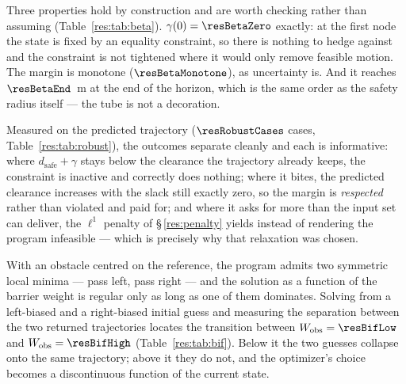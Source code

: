 Three properties hold by construction and are worth checking rather than assuming (Table~\ref{res:tab:beta}). $\gamma(0)=\resBetaZero$ exactly: at the first node the state is fixed by an equality constraint, so there is nothing to hedge against and the constraint is not tightened where it would only remove feasible motion. The margin is monotone ($\resBetaMonotone$), as uncertainty is. And it reaches $\resBetaEnd$~m at the end of the horizon, which is the same order as the safety radius itself --- the tube is not a decoration.

Measured on the predicted trajectory ($\resRobustCases$ cases, Table~\ref{res:tab:robust}), the outcomes separate cleanly and each is informative: where $d_{\mathrm{safe}}+\gamma$ stays below the clearance the trajectory already keeps, the constraint is inactive and correctly does nothing; where it bites, the predicted clearance increases with the slack still exactly zero, so the margin is \emph{respected} rather than violated and paid for; and where it asks for more than the input set can deliver, the $\ell^1$ penalty of \S\,\ref{res:penalty} yields instead of rendering the program infeasible --- which is precisely why that relaxation was chosen.




\label{res:bif}


With an obstacle centred on the reference, the program admits two symmetric local minima --- pass left, pass right --- and the solution as a function of the barrier weight is regular only as long as one of them dominates. Solving from a left-biased and a right-biased initial guess and measuring the separation between the two returned trajectories locates the transition between $\Wobs=\resBifLow$ and $\Wobs=\resBifHigh$ (Table~\ref{res:tab:bif}). Below it the two guesses collapse onto the same trajectory; above it they do not, and the optimizer's choice becomes a discontinuous function of the current state.

